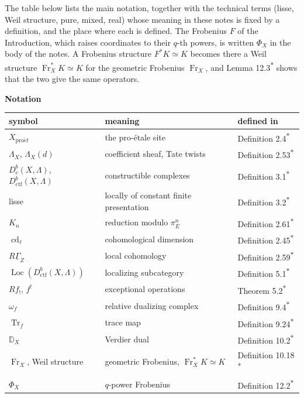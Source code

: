 \documentclass[11pt]{article}
\newcommand{\bpout}[1]{#1\textsuperscript{\hyperlink{bp-outside}{\ensuremath{\ast}}}}
\providecommand{\Dbc}{}\renewcommand{\Dbc}{D^b_c}
\providecommand{\Loc}{}\renewcommand{\Loc}{\operatorname{Loc}}
\begin{document}
The table below lists the main notation, together with the technical terms (lisse, Weil structure, pure, mixed, real) whose meaning in these notes is fixed by a definition, and the place where each is defined. The Frobenius \(F\) of the Introduction, which raises coordinates to their \(q\)-th powers, is written \(\Phi_X\) in the body of the notes. A Frobenius structure \(F^*K\simeq K\) becomes there a Weil structure \(\operatorname{Fr}_X^*K\simeq K\) for the geometric Frobenius \(\operatorname{Fr}_X\), and Lemma \bpout{12.3} shows that the two give the same operators.

\textbf{Notation}

\begin{center}\small
\begin{tabularx}{\linewidth}{>{\raggedright\arraybackslash}X>{\raggedright\arraybackslash}X>{\raggedright\arraybackslash}X}
\toprule
symbol & meaning & defined in \\
\midrule
\(X_{\mathrm{pro}\acute{e}t}\) & the pro-étale site & \bpout{Definition 2.4} \\
\(\Lambda_X\), \(\Lambda_X(d)\) & coefficient sheaf, Tate twists & \bpout{Definition 2.53} \\
\(\Dbc(X,\Lambda)\), \(D^b_{\mathrm{ctf}}(X,\Lambda)\) & constructible complexes & \bpout{Definition 3.1} \\
lisse & locally of constant finite presentation & \bpout{Definition 3.2} \\
\(K_n\) & reduction modulo \(\pi_E^n\) & \bpout{Definition 2.61} \\
\(\operatorname{cd}_\ell\) & cohomological dimension & \bpout{Definition 2.45} \\
\(R\underline\Gamma_Z\) & local cohomology & \bpout{Definition 2.59} \\
\(\Loc(D^b_{\mathrm{ctf}}(X,\Lambda))\) & localizing subcategory & \bpout{Definition 5.1} \\
\(Rf_!\), \(f^!\) & exceptional operations & \bpout{Theorem 5.2} \\
\(\omega_f\) & relative dualizing complex & \bpout{Definition 9.4} \\
\(\operatorname{Tr}_f\) & trace map & \bpout{Definition 9.24} \\
\(\mathbb D_X\) & Verdier dual & \bpout{Definition 10.2} \\
\(\operatorname{Fr}_X\), Weil structure & geometric Frobenius, \(\operatorname{Fr}_X^*K\simeq K\) & \bpout{Definition 10.18} \\
\(\Phi_X\) & \(q\)-power Frobenius & \bpout{Definition 12.2} \\

\end{tabularx}
\end{center}
\end{document}
